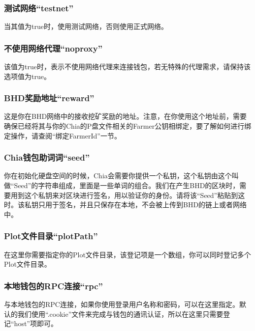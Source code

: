 \subsubsection{测试网络``testnet''}
\begin{flushleft}
    当其值为true时，使用测试网络，否则使用正式网络。
\end{flushleft}
\subsubsection{不使用网络代理``noproxy''}
\begin{flushleft}
    该值为true时，表示不使用网络代理来连接钱包，若无特殊的代理需求，请保持该选项值为true。
\end{flushleft}
\subsubsection{BHD奖励地址``reward''}
\begin{flushleft}
    这是你在BHD网络中的接收挖矿奖励的地址。注意，在你使用这个地址前，需要确保已经将其与你的Chia的P盘文件相关的Farmer公钥相绑定，要了解如何进行绑定操作，请查阅``绑定FarmerId''一节。
\end{flushleft}
\subsubsection{Chia钱包助词词``seed''}
\begin{flushleft}
    你在初始化硬盘空间的时候，Chia会需要你提供一个私钥，这个私钥由这个叫做``Seed''的字符串组成，里面是一些单词的组合。我们在产生BHD的区块时，需要用到这个私钥来对区块进行签名，用以验证你的身份。请将该``Seed''粘贴到这时。该私钥只用于签名，并且只保存在本地，不会被上传到BHD的链上或者网络中。
\end{flushleft}
\subsubsection{Plot文件目录``plotPath''}
\begin{flushleft}
    在这里你需要指定你的Plot文件目录，该登记项是一个数组，你可以同时登记多个Plot文件目录。
\end{flushleft}
\subsubsection{本地钱包的RPC连接``rpc''}
\begin{flushleft}
    与本地钱包的RPC连接，如果你使用登录用户名称和密码，可以在这里指定。默认的我们使用``.cookie''文件来完成与钱包的通讯认证，所以在这里只需要登记``host''项即可。
\end{flushleft}
